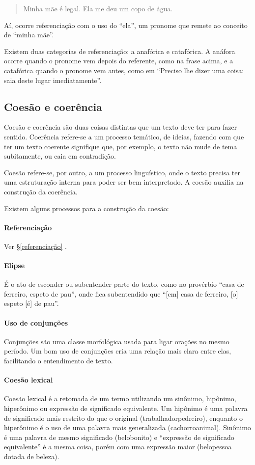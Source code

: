 \documentclass{article}
\begin{document}
\blockquote{
    Minha mãe é legal. Ela me deu um copo de água.
}

Aí, ocorre referenciação com o uso do ``ela'', um pronome que remete ao conceito de ``minha mãe''.

Existem duas categorias de referenciação: a anafórica e catafórica. A anáfora ocorre quando o pronome vem depois do referente, como na frase acima, e a catafórica quando o pronome vem antes, como em ``Preciso lhe dizer uma coisa: saia deste lugar imediatamente''.

\subsection{Coesão e coerência}
Coesão e coerência são duas coisas distintas que um texto deve ter para fazer sentido. Coerência refere-se a um processo temático, de ideias, fazendo com que ter um texto coerente signifique que, por exemplo, o texto não mude de tema subitamente, ou caia em contradição.

Coesão refere-se, por outro, a um processo linguístico, onde o texto precisa ter uma estruturação interna para poder ser bem interpretado. A coesão auxilia na construção da coerência.

Existem alguns processos para a construção da coesão:

\paragraph{Referenciação}
Ver \S\ref{referenciação}
.
\paragraph{Elipse}
É o ato de esconder ou subentender parte do texto, como no provérbio ``casa de ferreiro, espeto de pau'', onde fica subentendido que ``[em] casa de ferreiro, [o] espeto [é] de pau''.

\paragraph{Uso de conjunções}
Conjunções são uma classe morfológica usada para ligar orações no mesmo período. Um bom uso de conjunções cria uma relação mais clara entre elas, facilitando o entendimento de texto.

\paragraph{Coesão lexical}
Coesão lexical é a retomada de um termo utilizando um sinônimo, hipônimo, hiperônimo ou expressão de significado equivalente. Um hipônimo é uma palavra de significado mais restrito do que o original (trabalhador\textrightarrow pedreiro), enquanto o hiperônimo é o uso de uma palavra mais generalizada (cachorro\textrightarrow animal). Sinônimo é uma palavra de mesmo significado (belo\textrightarrow bonito) e ``expressão de significado equivalente'' é a mesma coisa, porém com uma expressão maior (belo\textrightarrow pessoa dotada de beleza).
\end{document}
